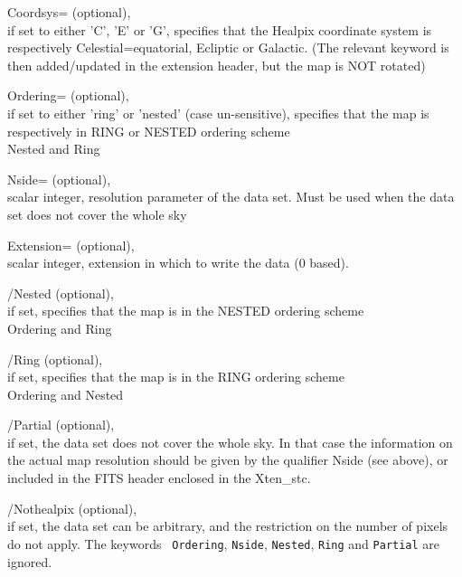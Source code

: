 \begin{keywords}
  \begin{kwlist}{} %
       \item[{Coordsys=}]
		  (optional), \\
		if set to either 'C', 'E' or 'G',  specifies that the
		Healpix coordinate system is respectively Celestial=equatorial,
		  Ecliptic or Galactic.
		(The relevant keyword is then added/updated in the extension
		  header, but the map is NOT rotated)

	\item[{Ordering=}]
		  (optional), \\
		if set to either 'ring' or 'nested' (case un-sensitive),
		  specifies that the map is respectively in RING or NESTED
		  ordering scheme\\
		\seealso Nested and Ring

	\item[{Nside=}] 
		(optional), \\
		scalar integer, \healpix resolution parameter of the
		data set. Must be used when the data set does not
		cover the whole sky

	\item[{Extension=}]
		(optional), \\
		scalar integer, extension in which to write the data
		(0 based).\\

	\item[{/Nested}] 
	  (optional), \\ 
	  if set, specifies that the map is in the NESTED ordering
	scheme\\
	\seealso Ordering and Ring 

	\item[{/Ring}] 
	  (optional), \\ 
	  if set, specifies that the map is in the RING ordering
	scheme\\
	\seealso Ordering and Nested

	\item[{/Partial}] 
	  (optional), \\ 
	  if set, the data set does not cover the whole sky. In
	that case the information on the actual map resolution should be given by the
	qualifier Nside (see above), or included in the FITS header enclosed in
	the Xten\_stc.

	\item[{/Nothealpix}] 
	  (optional), \\ 
	  if set, the data set can be arbitrary, and the
	restriction on the number of pixels do not apply. The keywords {\tt
	Ordering}, {\tt Nside}, {\tt Nested}, {\tt Ring} and {\tt Partial} are ignored.

   \end{kwlist}
\end{keywords}

